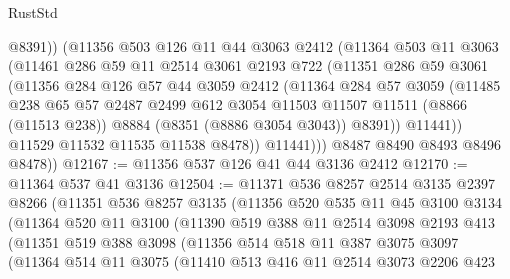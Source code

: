 \begin{lexlean}{RustStd}
\begin{coremodule}
{\begin{coremodule}
{{{{{{{{{{{{{{{{{{{{{{{{{{{{{{{{{{{{{{{{{{{{{{{{{{                @8391))
            (@11356
              @503
              @126
              @11
              @44
              @3063
              @2412
              (@11364
                @503
                @11
                @3063
                (@11461
                  @286
                  @59
                  @11
                  @2514
                  @3061
                  @2193
                  @722
                  (@11351
                    @286
                    @59
                    @3061
                    (@11356
                      @284
                      @126
                      @57
                      @44
                      @3059
                      @2412
                      (@11364
                        @284
                        @57
                        @3059
                        (@11485
                          @238
                          @65
                          @57
                          @2487
                          @2499
                          @612
                          @3054
                          @11503
                          @11507
                          @11511
                          (@8866 (@11513 @238))
                          @8884
                          (@8351 (@8886 @3054 @3043))
                          @8391))
                      @11441))
                  @11529
                  @11532
                  @11535
                  @11538
                  @8478))
              @11441)))
        @8487
        @8490
        @8493
        @8496
        @8478))
@12167 := @11356 @537 @126 @41 @44 @3136 @2412
@12170 := @11364 @537 @41 @3136
@12504 := @11371
    @536
    @8257
    @2514
    @3135
    @2397
    @8266
    (@11351
      @536
      @8257
      @3135
      (@11356
        @520
        @535
        @11
        @45
        @3100
        @3134
        (@11364
          @520
          @11
          @3100
          (@11390
            @519
            @388
            @11
            @2514
            @3098
            @2193
            @413
            (@11351
              @519
              @388
              @3098
              (@11356
                @514
                @518
                @11
                @387
                @3075
                @3097
                (@11364
                  @514
                  @11
                  @3075
                  (@11410
                    @513
                    @416
                    @11
                    @2514
                    @3073
                    @2206
                    @423
}}}}}}}}}}}}}}}}}}}}}}}}}}}}}}}}}}}}}}}}}}}}}}}}}}
\end{coremodule}}
\end{coremodule}
\end{lexlean}
